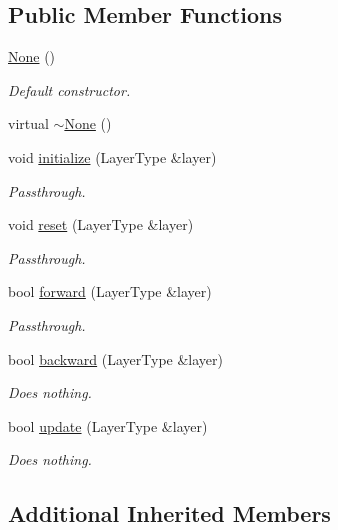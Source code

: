 \subsection*{Public Member Functions}
\begin{DoxyCompactItemize}
\item 
\hyperlink{classffnn_1_1optimizer_1_1_none_ae5ba72205a7f11508de871d6c3f1081f}{None} ()
\begin{DoxyCompactList}\small\item\em Default constructor. \end{DoxyCompactList}\item 
virtual \hyperlink{classffnn_1_1optimizer_1_1_none_a7e7dc203e5e857d44e1335ba9aac3711}{$\sim$\-None} ()
\item 
void \hyperlink{classffnn_1_1optimizer_1_1_none_a976eb3fe07f8c23a81851e7af4169ec8}{initialize} (Layer\-Type \&layer)
\begin{DoxyCompactList}\small\item\em Passthrough. \end{DoxyCompactList}\item 
void \hyperlink{classffnn_1_1optimizer_1_1_none_a10f714488a57b139b91a03939a8809ac}{reset} (Layer\-Type \&layer)
\begin{DoxyCompactList}\small\item\em Passthrough. \end{DoxyCompactList}\item 
bool \hyperlink{classffnn_1_1optimizer_1_1_none_a4aa65aa33dc45fa3b5d30e7f2a7169f2}{forward} (Layer\-Type \&layer)
\begin{DoxyCompactList}\small\item\em Passthrough. \end{DoxyCompactList}\item 
bool \hyperlink{classffnn_1_1optimizer_1_1_none_a1b8fb0b29f3f0afccc557f6b486fb3fe}{backward} (Layer\-Type \&layer)
\begin{DoxyCompactList}\small\item\em Does nothing. \end{DoxyCompactList}\item 
bool \hyperlink{classffnn_1_1optimizer_1_1_none_aa2d59b906b49fb976b50a810479637fd}{update} (Layer\-Type \&layer)
\begin{DoxyCompactList}\small\item\em Does nothing. \end{DoxyCompactList}\end{DoxyCompactItemize}
\subsection*{Additional Inherited Members}



